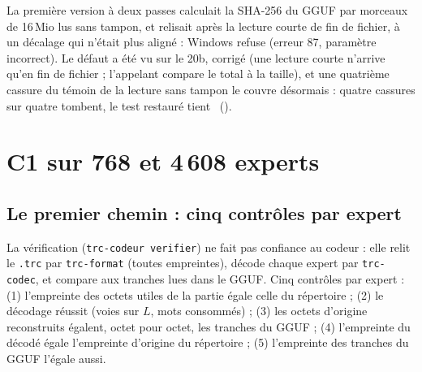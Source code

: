 \begin{faux}[title={Ce que le témoin n'avait pas couvert : l'erreur 87}]
La première version à deux passes calculait la SHA-256 du GGUF par morceaux de 16\,Mio lus sans tampon, et relisait après la lecture courte de fin de fichier, à un décalage qui n'était plus aligné : Windows refuse (erreur 87, paramètre incorrect). Le défaut a été vu sur le 20b, corrigé (une lecture courte n'arrive qu'en fin de fichier ; l'appelant compare le total à la taille), et une quatrième cassure du témoin de la lecture sans tampon le couvre désormais : quatre cassures sur quatre tombent, le test restauré tient \mes~().
\end{faux}

\section{C1 sur 768 et 4\,608 experts}\label{t2fmt:sec:cun}

\subsection{Le premier chemin : cinq contrôles par expert}

La vérification (\texttt{trc-codeur verifier}) ne fait pas confiance au codeur : elle relit le \texttt{.trc} par \texttt{trc-format} (toutes empreintes), décode chaque expert par \texttt{trc-codec}, et compare aux tranches lues dans le GGUF. Cinq contrôles par expert : (1) l'empreinte des octets utiles de la partie égale celle du répertoire ; (2) le décodage réussit (voies sur $L$, mots consommés) ; (3) les octets d'origine reconstruits égalent, octet pour octet, les tranches du GGUF ; (4) l'empreinte du décodé égale l'empreinte d'origine du répertoire ; (5) l'empreinte des tranches du GGUF l'égale aussi.

